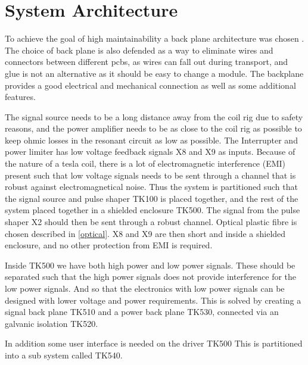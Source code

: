\section{System Architecture}
\label{sa}
To achieve the goal of high maintainability a back plane architecture was chosen . The choice of back plane is also defended as a way to eliminate wires and connectors between different pcbs, as wires can fall out during transport, and glue is not an alternative as it should be easy to change a module. The backplane provides a good electrical and mechanical connection as well as some additional features. 

The signal source needs to be a long distance away from the coil rig due to safety reasons, and the power amplifier needs to be as close to the coil rig as possible to keep ohmic losses in the resonant circuit as low as possible. The Interrupter and power limiter has low voltage feedback signals X8 and X9 as inputs. Because of the nature of a tesla coil, there is a lot of electromagnetic interference (EMI) present such that low voltage signals needs to be sent through a channel that is robust against electromagnetical noise. Thus the system is partitioned such that the signal source and pulse shaper TK100 is placed together, and the rest of the system placed together in a shielded enclosure TK500. The signal from the pulse shaper X2 should then be sent through a robust channel. Optical plastic fibre is chosen described in \cref{optical}. X8 and X9 are then short and inside a shielded enclosure, and no other protection from EMI is required.

Inside TK500 we have both high power and low power signals. These should be separated such that the high power signals does not provide interference for the low power signals. And so that the electronics with low power signals can be designed with lower voltage and power requirements. This is solved by creating a signal back plane TK510 and a power back plane TK530, connected via an galvanic isolation TK520.

In addition some user interface is needed on the driver TK500 This is partitioned into a sub system called TK540.


 
